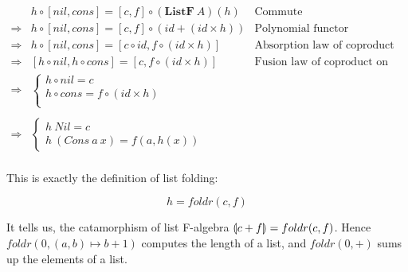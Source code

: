\documentclass[b5paper]{article}
\begin{document}
\begin{example}
\[
\begin{array}{rll}
            & h \circ [nil, cons] = [c, f] \circ (\mathbf{ListF}\ A)(h) & \text{Commute} \\
\Rightarrow & h \circ [nil, cons] = [c, f] \circ (id + (id \times h)) & \text{Polynomial functor} \\
\Rightarrow & h \circ [nil, cons] = [c \circ id, f \circ (id \times h)] & \text{Absorption law of coproduct on the right} \\
\Rightarrow & [h \circ nil, h \circ cons] = [c, f \circ (id \times h)] & \text{Fusion law of coproduct on the left} \\
\Rightarrow &
  \begin{cases}
    h \circ nil = c \\
    h \circ cons = f \circ (id \times h) \\
  \end{cases} & \\
\\
\Rightarrow &
  \begin{cases}
    h\ Nil = c \\
    h\ (Cons\ a\ x) = f(a, h(x))
  \end{cases} & \\
\end{array}
\]

This is exactly the definition of list folding:

\[
  h = foldr(c, f)
\]

It tells us, the catamorphism of list F-algebra $\llparenthesis c + f \rrparenthesis = foldr(c, f)$. Hence $foldr(0, (a, b) \mapsto b + 1)$ computes the length of a list, and $foldr(0, +)$ sums up the elements of a list.
\end{example}
\end{document}

